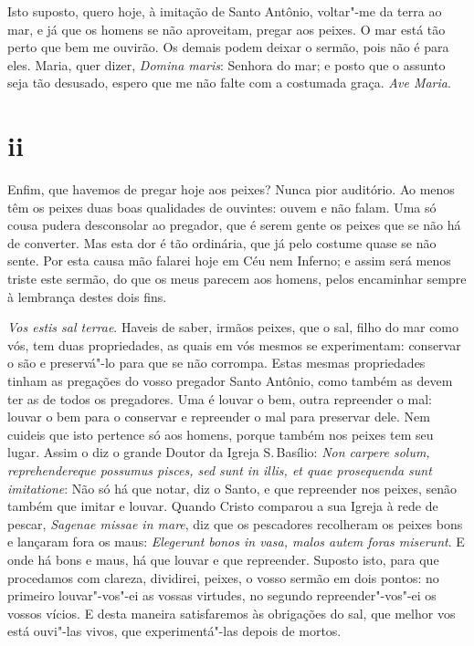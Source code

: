 Isto suposto, quero hoje, à imitação de Santo Antônio, voltar"-me da
terra ao mar, e já que os homens se não aproveitam, pregar aos peixes. O
mar está tão perto que bem me ouvirão. Os demais podem deixar o sermão,
pois não é para eles. Maria, quer dizer, \emph{Domina maris}: Senhora
do mar; e posto que o assunto seja tão desusado, espero que me não
falte com a costumada graça. \emph{Ave Maria}.

\section*{ii}

Enfim, que havemos de pregar hoje aos peixes? Nunca pior auditório. Ao
menos têm os peixes duas boas qualidades de ouvintes: ouvem e não falam.
Uma só cousa pudera desconsolar ao pregador, que é serem gente os peixes
que se não há de converter. Mas esta dor é tão ordinária, que já pelo
costume quase se não sente. Por esta causa mão falarei hoje em Céu nem
Inferno; e assim será menos triste este sermão, do que os meus parecem
aos homens, pelos encaminhar sempre à lembrança destes dois fins.

\emph{Vos estis sal terrae}. Haveis de saber, irmãos peixes, que o sal,
filho do mar
como vós, tem duas propriedades, as quais em vós mesmos se experimentam:
conservar o são e preservá"-lo para que se não corrompa. Estas mesmas
propriedades tinham as pregações do vosso pregador Santo Antônio, como
também as devem ter as de todos os pregadores. Uma é louvar o bem, outra
repreender o mal: louvar o bem para o conservar e repreender o mal para
preservar dele. Nem cuideis que isto pertence só aos homens, porque
também nos peixes tem seu lugar. Assim o diz o grande Doutor da Igreja
S.\,Basílio: \emph{Non carpere solum, reprehendereque possumus pisces,
sed sunt in illis, et quae prosequenda sunt imitatione}: Não só há que
notar, diz o Santo, e que repreender nos peixes, senão também que imitar
e louvar. Quando Cristo comparou a sua Igreja à rede de pescar,
\emph{Sagenae missae in mare}, diz que os pescadores recolheram os
peixes bons e lançaram fora os maus: \emph{Elegerunt bonos in vasa,
malos autem foras miserunt}. E onde há bons e maus, há que louvar e que
repreender. Suposto isto,
para que procedamos com clareza, dividirei, peixes, o vosso sermão em
dois pontos: no primeiro louvar"-vos"-ei as vossas virtudes, no segundo
repreender"-vos"-ei os vossos vícios. E desta maneira satisfaremos às
obrigações do sal, que melhor vos está ouvi"-las vivos, que
experimentá"-las depois de mortos.

